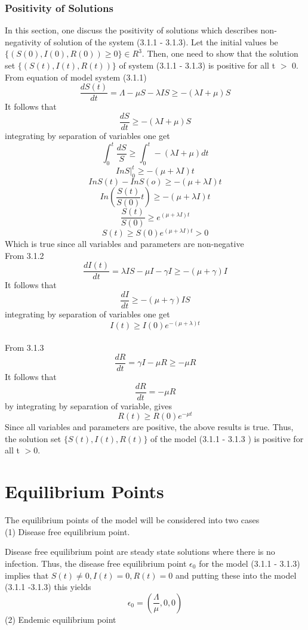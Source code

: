 \documentclass[a4paper,12pt]{report}
\numberwithin{equation}{section}
\begin{document}
\subsubsection{Positivity of Solutions}

In this section, one discuss the positivity of solutions which describes non-negativity of solution of the system (3.1.1 - 3.1.3). Let the initial values be $\{(S(0),I(0),R(0))\geq 0\} \in R^{3}$. Then, one need to show that the solution set $\{(S(t),I(t),R(t))\}$ of system (3.1.1 - 3.1.3) is positive for all t $>$ 0.\\
From equation of model system (3.1.1) 
$$\frac{dS(t)}{dt} = \Lambda - \mu S - \lambda IS \geq - (\lambda I + \mu ) S $$
It follows that
$$\frac{dS}{dt} \geq - (\lambda I + \mu ) S$$ 
integrating by separation of variables one get 
$$\int_{0}^{t} \frac{dS}{S} \geq \int_{0}^{t} - (\lambda I + \mu ) dt $$
$$ InS\vert_{0}^{t} \geq -(\mu + \lambda I)t $$
$$InS(t) - In S(o)\geq -(\mu + \lambda I)t  $$
$$In \left(\frac{S(t)}{S(0)}t \right) \geq -(\mu + \lambda I)t $$ 
$$\frac{S(t)}{S(0)} \geq e^{(\mu + \lambda I)t}$$
$$S(t)\geq S(0)e^{(\mu + \lambda I)t} > 0$$
Which is true since all variables and parameters are non-negative \\
From 3.1.2 
$$\frac{dI(t)}{dt} = \lambda IS - \mu I - \gamma I \geq - (\mu + \gamma )I $$
It follows that
$$\frac{dI}{dt} \geq - (\mu + \gamma )I S$$ 
integrating by separation of variables one get 
$$I(t) \geq I(0)e^{-(\mu + \lambda)t}$$\\
From 3.1.3 
$$\frac{dR}{dt} = \gamma I - \mu R \geq - \mu R$$
It follows that
$$\frac{dR}{dt} = -\mu R $$
by integrating by separation of variable, gives
$$R(t) \geq R(0)e^{-\mu t}  $$
Since all variables and parameters are positive, the above results is true. Thus, the solution set $\{S(t),I(t), R(t) \}$ of the model (3.1.1 - 3.1.3 ) is positive for all t $> $0.
\section{Equilibrium Points }

The equilibrium points of the model will be considered into two cases \\
(1) Disease free equilibrium point.


Disease free equilibrium point are steady state solutions where there is no infection. Thus, the disease free equilibrium point $\epsilon_{0} $ for the model (3.1.1 - 3.1.3) implies that $S(t)\neq 0, I(t) = 0, R(t) = 0$ and putting these into the model (3.1.1 -3.1.3) this yields 
$$\epsilon_{0} = (\frac{\Lambda}{\mu}, 0, 0)$$ 
(2) Endemic equilibrium point
\end{document}
